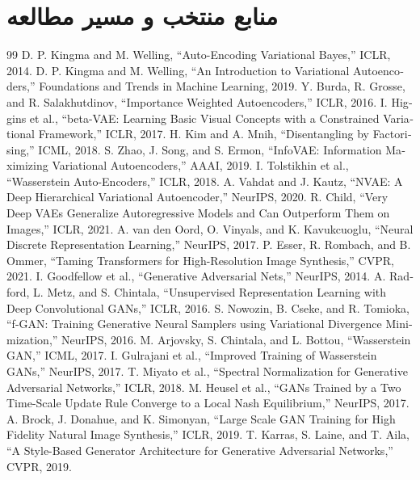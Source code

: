 \documentclass[12pt,openany,oneside]{book}
\begin{document}
\section*{منابع منتخب و مسیر مطالعه}
\begin{latin}
\begin{thebibliography}{99}
 D. P. Kingma and M. Welling, ``Auto-Encoding Variational Bayes,'' ICLR, 2014.
 D. P. Kingma and M. Welling, ``An Introduction to Variational Autoencoders,'' Foundations and Trends in Machine Learning, 2019.
 Y. Burda, R. Grosse, and R. Salakhutdinov, ``Importance Weighted Autoencoders,'' ICLR, 2016.
 I. Higgins et al., ``beta-VAE: Learning Basic Visual Concepts with a Constrained Variational Framework,'' ICLR, 2017.
 H. Kim and A. Mnih, ``Disentangling by Factorising,'' ICML, 2018.
 S. Zhao, J. Song, and S. Ermon, ``InfoVAE: Information Maximizing Variational Autoencoders,'' AAAI, 2019.
 I. Tolstikhin et al., ``Wasserstein Auto-Encoders,'' ICLR, 2018.
 A. Vahdat and J. Kautz, ``NVAE: A Deep Hierarchical Variational Autoencoder,'' NeurIPS, 2020.
 R. Child, ``Very Deep VAEs Generalize Autoregressive Models and Can Outperform Them on Images,'' ICLR, 2021.
 A. van den Oord, O. Vinyals, and K. Kavukcuoglu, ``Neural Discrete Representation Learning,'' NeurIPS, 2017.
 P. Esser, R. Rombach, and B. Ommer, ``Taming Transformers for High-Resolution Image Synthesis,'' CVPR, 2021.
 I. Goodfellow et al., ``Generative Adversarial Nets,'' NeurIPS, 2014.
 A. Radford, L. Metz, and S. Chintala, ``Unsupervised Representation Learning with Deep Convolutional GANs,'' ICLR, 2016.
 S. Nowozin, B. Cseke, and R. Tomioka, ``f-GAN: Training Generative Neural Samplers using Variational Divergence Minimization,'' NeurIPS, 2016.
 M. Arjovsky, S. Chintala, and L. Bottou, ``Wasserstein GAN,'' ICML, 2017.
 I. Gulrajani et al., ``Improved Training of Wasserstein GANs,'' NeurIPS, 2017.
 T. Miyato et al., ``Spectral Normalization for Generative Adversarial Networks,'' ICLR, 2018.
 M. Heusel et al., ``GANs Trained by a Two Time-Scale Update Rule Converge to a Local Nash Equilibrium,'' NeurIPS, 2017.
 A. Brock, J. Donahue, and K. Simonyan, ``Large Scale GAN Training for High Fidelity Natural Image Synthesis,'' ICLR, 2019.
 T. Karras, S. Laine, and T. Aila, ``A Style-Based Generator Architecture for Generative Adversarial Networks,'' CVPR, 2019.

\end{thebibliography}
\end{latin}
\end{document}
